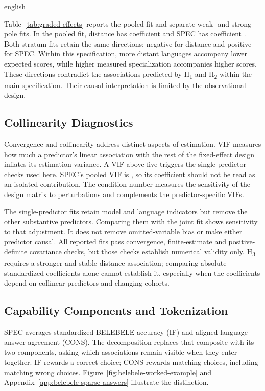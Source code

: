 \begin{otherlanguage*}{english}
\GradedEffectsTable

Table~\ref{tab:graded-effects} reports the pooled fit and separate weak- and strong-pole fits. In the pooled fit, distance has coefficient \GDistanceInterval{} and SPEC has coefficient \GSpecInterval{}. Both stratum fits retain the same directions: negative for distance and positive for SPEC. Within this specification, more distant languages accompany lower expected scores, while higher measured specialization accompanies higher scores. These directions contradict the associations predicted by H\textsubscript{1} and H\textsubscript{2} within the main specification. Their causal interpretation is limited by the observational design.

\subsection{Collinearity Diagnostics}

Convergence and collinearity address distinct aspects of estimation. VIF measures how much a predictor's linear association with the rest of the fixed-effect design inflates its estimation variance. A VIF above five triggers the single-predictor checks used here. SPEC's pooled VIF is \GSpecVIF{}, so its coefficient should not be read as an isolated contribution. The condition number measures the sensitivity of the design matrix to perturbations and complements the predictor-specific VIFs.

\clearpage
\GradedDiagnosticsTable
\GradedSingleTable

The single-predictor fits retain model and language indicators but remove the other substantive predictors. Comparing them with the joint fit shows sensitivity to that adjustment. It does not remove omitted-variable bias or make either predictor causal. All reported fits pass convergence, finite-estimate and positive-definite covariance checks, but those checks establish numerical validity only. H\textsubscript{3} requires a stronger and stable distance association; comparing absolute standardized coefficients alone cannot establish it, especially when the coefficients depend on collinear predictors and changing cohorts.

\subsection{Capability Components and Tokenization}

SPEC averages standardized BELEBELE accuracy (IF) and aligned-language answer agreement (CONS). The decomposition replaces that composite with its two components, asking which associations remain visible when they enter together. IF rewards a correct choice; CONS rewards matching choices, including matching wrong choices. Figure~\ref{fig:belebele-worked-example} and Appendix~\ref{app:belebele-sparse-answers} illustrate the distinction.


\end{otherlanguage*}
